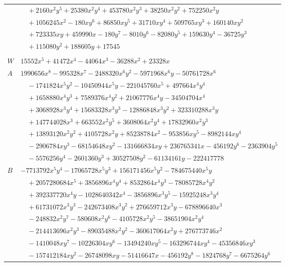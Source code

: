 \documentclass[11pt]{article}
\begin{document}
\begin{longtable}{@{}ll@{}}
 & $\quad +2160x^{2}y^{5}+25380x^{2}y^{4}+453780x^{2}y^{3}+38250x^{2}y^{2}+752250x^{2}y$\\
 & $\quad +1056245x^{2}-180xy^{6}+86850xy^{5}+31710xy^{4}+509765xy^{3}+160140xy^{2}$\\
 & $\quad +723335xy+459990x-180y^{7}-8010y^{6}-82080y^{5}+159630y^{4}-36725y^{3}$\\
 & $\quad +115080y^{2}+188605y+17545$\\
\addlinespace[3pt]
\multicolumn{2}{@{}l}{$i=60$, $m=432$, neighbours $5,10,11,18,38,42,70,78$}\\
$W$ & $15552x^{5}+41472x^{4}-44064x^{3}-36288x^{2}+23328x$\\
$A$ & $1990656x^{8}-995328x^{7}-2488320x^{6}y^{2}-5971968x^{6}y-50761728x^{6}$\\
 & $\quad -1741824x^{5}y^{2}-10450944x^{5}y-221045760x^{5}+497664x^{4}y^{4}$\\
 & $\quad +1658880x^{4}y^{3}+7589376x^{4}y^{2}+21067776x^{4}y-34504704x^{4}$\\
 & $\quad +3068928x^{3}y^{4}+15683328x^{3}y^{3}-12886848x^{3}y^{2}+323310288x^{3}y$\\
 & $\quad +147744028x^{3}+663552x^{2}y^{5}+3608064x^{2}y^{4}+17832960x^{2}y^{3}$\\
 & $\quad +13893120x^{2}y^{2}+4105728x^{2}y+85238784x^{2}-953856xy^{5}-8982144xy^{4}$\\
 & $\quad -2906784xy^{3}-68154648xy^{2}-131666834xy+236765341x-456192y^{6}-2363904y^{5}$\\
 & $\quad -5576256y^{4}-2601360y^{3}+30527508y^{2}-61134161y-222417778$\\
$B$ & $-7713792x^{5}y^{4}-17065728x^{5}y^{3}+156171456x^{5}y^{2}-784675440x^{5}y$\\
 & $\quad +2057280684x^{5}+3856896x^{4}y^{4}+8532864x^{4}y^{3}-78085728x^{4}y^{2}$\\
 & $\quad +392337720x^{4}y-1028640342x^{4}-3856896x^{3}y^{5}-15925248x^{3}y^{4}$\\
 & $\quad +61731072x^{3}y^{3}-242673408x^{3}y^{2}+276659712x^{3}y-678896640x^{3}$\\
 & $\quad -248832x^{2}y^{7}-580608x^{2}y^{6}-4105728x^{2}y^{5}-38651904x^{2}y^{4}$\\
 & $\quad -214413696x^{2}y^{3}-89035488x^{2}y^{2}-360617064x^{2}y+276773746x^{2}$\\
 & $\quad -1410048xy^{7}-10226304xy^{6}-13494240xy^{5}-163296744xy^{4}-45356846xy^{3}$\\
 & $\quad -157412184xy^{2}-26748098xy-51416647x-456192y^{8}-1824768y^{7}-6675264y^{6}$\\

\end{longtable}
\end{document}
